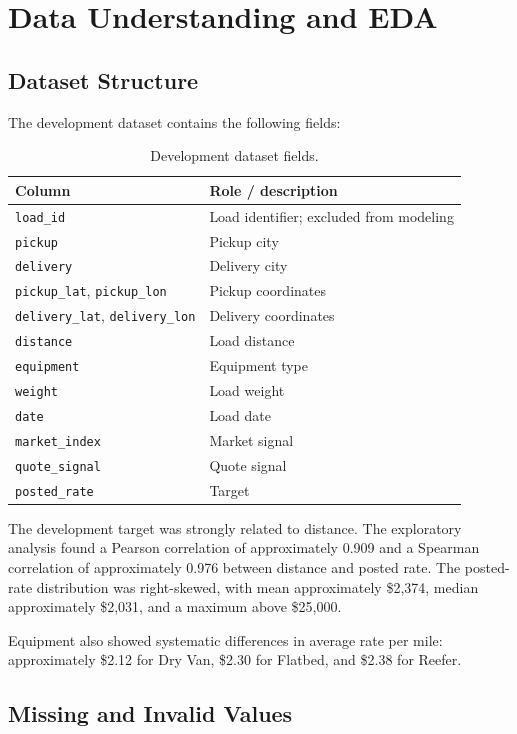 \documentclass[11pt,a4paper]{article}
\begin{document}
\section{Data Understanding and EDA}

\subsection{Dataset Structure}

The development dataset contains the following fields:

\begin{table}[H]
\centering
\small
\begin{tabular}{ll}
\toprule
\textbf{Column} & \textbf{Role / description}\\
\midrule
\texttt{load\_id} & Load identifier; excluded from modeling\\
\texttt{pickup} & Pickup city\\
\texttt{delivery} & Delivery city\\
\texttt{pickup\_lat}, \texttt{pickup\_lon} & Pickup coordinates\\
\texttt{delivery\_lat}, \texttt{delivery\_lon} & Delivery coordinates\\
\texttt{distance} & Load distance\\
\texttt{equipment} & Equipment type\\
\texttt{weight} & Load weight\\
\texttt{date} & Load date\\
\texttt{market\_index} & Market signal\\
\texttt{quote\_signal} & Quote signal\\
\texttt{posted\_rate} & Target\\
\bottomrule
\end{tabular}
\caption{Development dataset fields.}
\end{table}

The development target was strongly related to distance. The exploratory analysis found a Pearson correlation of approximately 0.909 and a Spearman correlation of approximately 0.976 between distance and posted rate. The posted-rate distribution was right-skewed, with mean approximately \$2,374, median approximately \$2,031, and a maximum above \$25,000.

Equipment also showed systematic differences in average rate per mile: approximately \$2.12 for Dry Van, \$2.30 for Flatbed, and \$2.38 for Reefer.

\subsection{Missing and Invalid Values}
\end{document}
